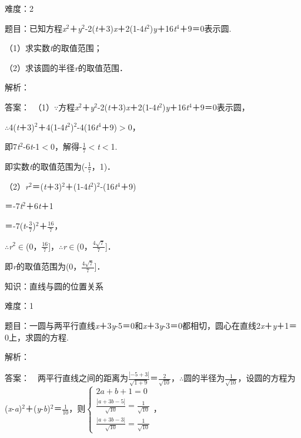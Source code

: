 \documentclass{article} %
\begin{document}
难度：2

题目：已知方程\textit{x}${}^{2}$＋\textit{y}${}^{2}$-2(\textit{t}＋3)\textit{x}＋2(1-4\textit{t}${}^{2}$)\textit{y}＋16\textit{t}${}^{4}$＋9＝0表示圆.

（1）求实数\textit{t}的取值范围；

（2）求该圆的半径\textit{r}的取值范围．

解析：

答案：　（1）$\mathrm{\because}$方程\textit{x}${}^{2}$＋\textit{y}${}^{2}$-2(\textit{t}＋3)\textit{x}＋2(1-4\textit{t}${}^{2}$)\textit{y}＋16\textit{t}${}^{4}$＋9＝0表示圆，

$\mathrm{\therefore}$4(\textit{t}＋3)${}^{2}$＋4(1-4\textit{t}${}^{2}$)${}^{2}$-4(16\textit{t}${}^{4}$＋9)$\mathrm{>}$0，

即7\textit{t}${}^{2}$-6\textit{t}-1$\mathrm{<}$0，解得-$\frac{1}{7}$$\mathrm{<}$\textit{t}$\mathrm{<}$1.

即实数\textit{t}的取值范围为(-$\frac{1}{7}$，1)．

（2）\textit{r}${}^{2}$＝(\textit{t}＋3)${}^{2}$＋(1-4\textit{t}${}^{2}$)${}^{2}$-(16\textit{t}${}^{4}$＋9)

＝-7\textit{t}${}^{2}$＋6\textit{t}＋1

＝-7(\textit{t}-$\frac{3}{7}$)${}^{2}$＋$\frac{16}{7}$，

$\mathrm{\therefore}$\textit{r}${}^{2}$$\mathrm{\in}$(0，$\frac{16}{7}$]，$\mathrm{\therefore}$\textit{r}$\mathrm{\in}$(0，$\frac{4\sqrt{7}}{7}$]．

即\textit{r}的取值范围为(0，$\frac{4\sqrt{7}}{7}$]．

知识：直线与圆的位置关系

难度：1

题目：一圆与两平行直线\textit{x}＋3\textit{y}-5＝0和\textit{x}＋3\textit{y}-3＝0都相切，圆心在直线2\textit{x}＋\textit{y}＋1＝0上，求圆的方程.

解析：

答案：　两平行直线之间的距离为$\frac{|-5+3|}{\sqrt{1+9}}$＝$\frac{2}{\sqrt{10}}$，$\mathrm{\therefore}$圆的半径为$\frac{1}{\sqrt{10}}$，设圆的方程为(\textit{x}-\textit{a})${}^{2}$＋(\textit{y}-\textit{b})${}^{2}$＝$\frac{1}{10}$，则$\left\{\begin{array}{r} 2a+b+1=0\\ \frac{|a+3b-5|}{\sqrt{10}}=\frac{1}{\sqrt{10}}\\ \frac{|a+3b-3|}{\sqrt{10}}=\frac{1}{\sqrt{10}} \end{array} \right.$，
\end{document}
